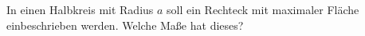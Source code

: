\begin{ExerciseBlock}
In einen Halbkreis mit Radius $a$ soll ein Rechteck mit maximaler Fläche einbeschrieben werden. Welche Ma\ss e hat dieses?

\end{ExerciseBlock}
